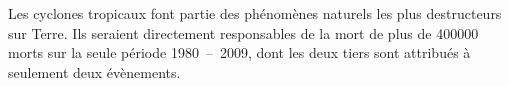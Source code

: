 \documentclass[../main.tex]{subfiles}
\begin{document}
Les cyclones tropicaux font partie des phénomènes naturels les plus destructeurs sur Terre. Ils seraient directement responsables de la mort de plus de
\num{400000} morts sur la seule période \num{1980}~--~\num{2009}, dont les deux tiers sont attribués à seulement deux évènements.
\end{document}
